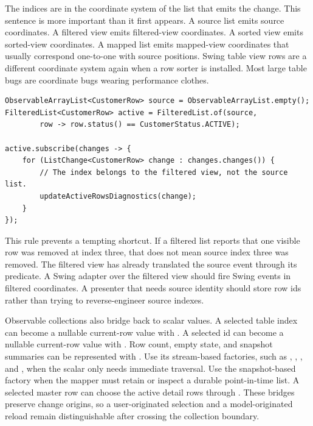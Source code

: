 The indices are in the coordinate system of the list that emits the change. This
sentence is more important than it first appears. A source list emits source
coordinates. A filtered view emits filtered-view coordinates. A sorted view
emits sorted-view coordinates. A mapped list emits mapped-view coordinates that
usually correspond one-to-one with source positions. Swing table view rows are a
different coordinate system again when a row sorter is installed. Most large
table bugs are coordinate bugs wearing performance clothes.

\begin{lstlisting}[caption={A change is interpreted in the emitting list's coordinates.}]
ObservableArrayList<CustomerRow> source = ObservableArrayList.empty();
FilteredList<CustomerRow> active = FilteredList.of(source,
        row -> row.status() == CustomerStatus.ACTIVE);

active.subscribe(changes -> {
    for (ListChange<CustomerRow> change : changes.changes()) {
        // The index belongs to the filtered view, not the source list.
        updateActiveRowsDiagnostics(change);
    }
});
\end{lstlisting}

This rule prevents a tempting shortcut. If a filtered list reports that one
visible row was removed at index three, that does not mean source index three
was removed. The filtered view has already translated the source event through
its predicate. A Swing adapter over the filtered view should fire Swing events
in filtered coordinates. A presenter that needs source identity should store row
ids rather than trying to reverse-engineer source indexes.

Observable collections also bridge back to scalar values. A selected table index
can become a nullable current-row value with . A
selected id can become a nullable current-row value with
. Row count, empty state, and snapshot summaries
can be represented with . Use its stream-based
factories, such as , , , and
, when the scalar only needs immediate traversal. Use the
snapshot-based factory when the mapper must retain or inspect a durable
point-in-time list. A selected master row can choose the active detail rows
through . These bridges preserve change origins, so
a user-originated selection and a model-originated reload remain
distinguishable after crossing the collection boundary.

